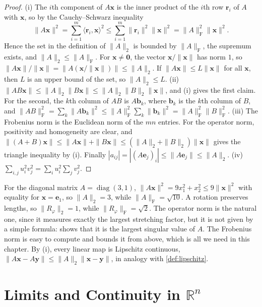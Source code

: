 \begin{proof}
(i) The $i$th component of $A\mathbf x$ is the inner product of the $i$th row $\mathbf r_i$ of $A$ with $\mathbf x$, so by the Cauchy--Schwarz inequality
\[
\|A\mathbf x\|^2=\sum_{i=1}^m\langle\mathbf r_i,\mathbf x\rangle^2\le\sum_{i=1}^m\|\mathbf r_i\|^2\|\mathbf x\|^2=\|A\|_{\mathrm F}^2\|\mathbf x\|^2 .
\]
Hence the set in the definition of $\|A\|_2$ is bounded by $\|A\|_{\mathrm F}$, the supremum exists, and $\|A\|_2\le\|A\|_{\mathrm F}$. For $\mathbf x\ne\mathbf 0$, the vector $\mathbf x/\|\mathbf x\|$ has norm $1$, so $\|A\mathbf x\|/\|\mathbf x\|=\|A(\mathbf x/\|\mathbf x\|)\|\le\|A\|_2$. If $\|A\mathbf x\|\le L\|\mathbf x\|$ for all $\mathbf x$, then $L$ is an upper bound of the set, so $\|A\|_2\le L$. (ii) $\|AB\mathbf x\|\le\|A\|_2\|B\mathbf x\|\le\|A\|_2\|B\|_2\|\mathbf x\|$, and (i) gives the first claim. For the second, the $k$th column of $AB$ is $A\mathbf b_k$, where $\mathbf b_k$ is the $k$th column of $B$, and $\|AB\|_{\mathrm F}^2=\sum_k\|A\mathbf b_k\|^2\le\|A\|_{\mathrm F}^2\sum_k\|\mathbf b_k\|^2=\|A\|_{\mathrm F}^2\|B\|_{\mathrm F}^2$. (iii) The Frobenius norm is the Euclidean norm of the $mn$ entries. For the operator norm, positivity and homogeneity are clear, and $\|(A+B)\mathbf x\|\le\|A\mathbf x\|+\|B\mathbf x\|\le(\|A\|_2+\|B\|_2)\|\mathbf x\|$ gives the triangle inequality by (i). Finally $|a_{ij}|=|(A\mathbf e_j)_i|\le\|A\mathbf e_j\|\le\|A\|_2$. (iv) $\sum_{i,j}u_i^2v_j^2=\sum_iu_i^2\sum_jv_j^2$.
\end{proof}

For the diagonal matrix $A=\operatorname{diag}(3,1)$, $\|A\mathbf x\|^2=9x_1^2+x_2^2\le9\|\mathbf x\|^2$ with equality for $\mathbf x=\mathbf e_1$, so $\|A\|_2=3$, while $\|A\|_{\mathrm F}=\sqrt{10}$. A rotation preserves lengths, so $\|R_\varphi\|_2=1$, while $\|R_\varphi\|_{\mathrm F}=\sqrt2$. The operator norm is the natural one, since it measures exactly the largest stretching factor, but it is not given by a simple formula:  shows that it is the largest singular value of $A$. The Frobenius norm is easy to compute and bounds it from above, which is all we need in this chapter. By (i), every linear map is Lipschitz continuous, $\|A\mathbf x-A\mathbf y\|\le\|A\|_2\|\mathbf x-\mathbf y\|$, in analogy with \cref{def:lipschitz}.

\section{Limits and Continuity in \texorpdfstring{$\mathbb R^n$}{R\^{}n}}
\label{sec:limits-rn}

